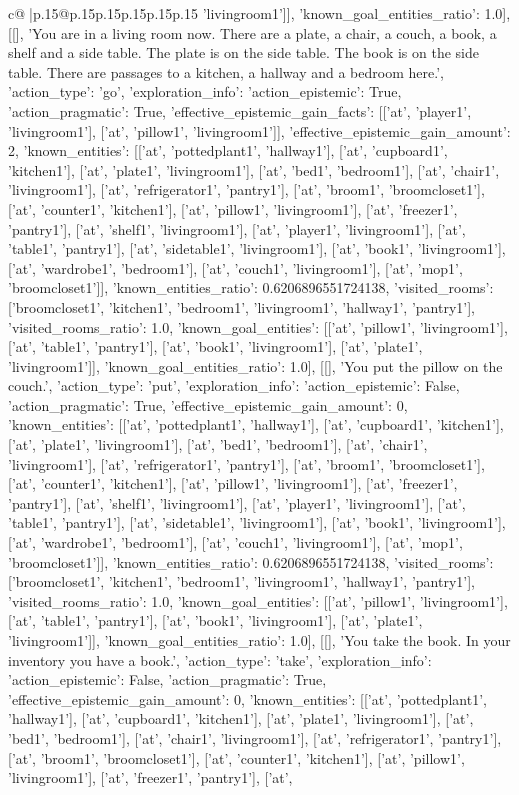 \documentclass{article}
\begin{document}
{\begin{supertabular}{c@{$\;$}|p{.15\linewidth}@{}p{.15\linewidth}p{.15\linewidth}p{.15\linewidth}p{.15\linewidth}p{.15\linewidth}}
{{{'livingroom1']], 'known_goal_entities_ratio': 1.0}}], [[], 'You are in a living room now. There are a plate, a chair, a couch, a book, a shelf and a side table. The plate is on the side table. The book is on the side table. There are passages to a kitchen, a hallway and a bedroom here.', {'action_type': 'go', 'exploration_info': {'action_epistemic': True, 'action_pragmatic': True, 'effective_epistemic_gain_facts': [['at', 'player1', 'livingroom1'], ['at', 'pillow1', 'livingroom1']], 'effective_epistemic_gain_amount': 2, 'known_entities': [['at', 'pottedplant1', 'hallway1'], ['at', 'cupboard1', 'kitchen1'], ['at', 'plate1', 'livingroom1'], ['at', 'bed1', 'bedroom1'], ['at', 'chair1', 'livingroom1'], ['at', 'refrigerator1', 'pantry1'], ['at', 'broom1', 'broomcloset1'], ['at', 'counter1', 'kitchen1'], ['at', 'pillow1', 'livingroom1'], ['at', 'freezer1', 'pantry1'], ['at', 'shelf1', 'livingroom1'], ['at', 'player1', 'livingroom1'], ['at', 'table1', 'pantry1'], ['at', 'sidetable1', 'livingroom1'], ['at', 'book1', 'livingroom1'], ['at', 'wardrobe1', 'bedroom1'], ['at', 'couch1', 'livingroom1'], ['at', 'mop1', 'broomcloset1']], 'known_entities_ratio': 0.6206896551724138, 'visited_rooms': ['broomcloset1', 'kitchen1', 'bedroom1', 'livingroom1', 'hallway1', 'pantry1'], 'visited_rooms_ratio': 1.0, 'known_goal_entities': [['at', 'pillow1', 'livingroom1'], ['at', 'table1', 'pantry1'], ['at', 'book1', 'livingroom1'], ['at', 'plate1', 'livingroom1']], 'known_goal_entities_ratio': 1.0}}], [[], 'You put the pillow on the couch.', {'action_type': 'put', 'exploration_info': {'action_epistemic': False, 'action_pragmatic': True, 'effective_epistemic_gain_amount': 0, 'known_entities': [['at', 'pottedplant1', 'hallway1'], ['at', 'cupboard1', 'kitchen1'], ['at', 'plate1', 'livingroom1'], ['at', 'bed1', 'bedroom1'], ['at', 'chair1', 'livingroom1'], ['at', 'refrigerator1', 'pantry1'], ['at', 'broom1', 'broomcloset1'], ['at', 'counter1', 'kitchen1'], ['at', 'pillow1', 'livingroom1'], ['at', 'freezer1', 'pantry1'], ['at', 'shelf1', 'livingroom1'], ['at', 'player1', 'livingroom1'], ['at', 'table1', 'pantry1'], ['at', 'sidetable1', 'livingroom1'], ['at', 'book1', 'livingroom1'], ['at', 'wardrobe1', 'bedroom1'], ['at', 'couch1', 'livingroom1'], ['at', 'mop1', 'broomcloset1']], 'known_entities_ratio': 0.6206896551724138, 'visited_rooms': ['broomcloset1', 'kitchen1', 'bedroom1', 'livingroom1', 'hallway1', 'pantry1'], 'visited_rooms_ratio': 1.0, 'known_goal_entities': [['at', 'pillow1', 'livingroom1'], ['at', 'table1', 'pantry1'], ['at', 'book1', 'livingroom1'], ['at', 'plate1', 'livingroom1']], 'known_goal_entities_ratio': 1.0}}], [[], 'You take the book. In your inventory you have a book.', {'action_type': 'take', 'exploration_info': {'action_epistemic': False, 'action_pragmatic': True, 'effective_epistemic_gain_amount': 0, 'known_entities': [['at', 'pottedplant1', 'hallway1'], ['at', 'cupboard1', 'kitchen1'], ['at', 'plate1', 'livingroom1'], ['at', 'bed1', 'bedroom1'], ['at', 'chair1', 'livingroom1'], ['at', 'refrigerator1', 'pantry1'], ['at', 'broom1', 'broomcloset1'], ['at', 'counter1', 'kitchen1'], ['at', 'pillow1', 'livingroom1'], ['at', 'freezer1', 'pantry1'], ['at', }}}
\end{supertabular}}
\end{document}
